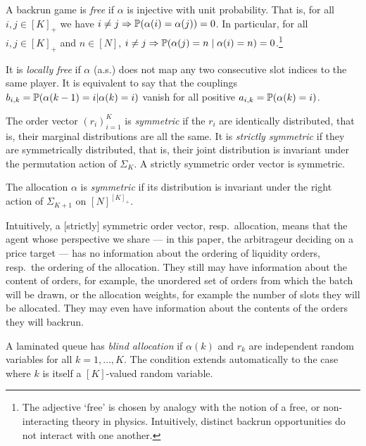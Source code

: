 \begin{definition}[Freeness] \label{locally-free} \label{free}

  A backrun game is \emph{free} if $\alpha$ is injective with unit probability.
  That is, for all $i,j\in [K]_+$ we have $i\neq j \Rightarrow \mathbb{P}(\alpha(i)=\alpha(j))=0$.
  In particular, for all $i,j\in [K]_+$ and $n\in[N]$, $i\neq j \Rightarrow \mathbb{P}(\alpha(j)=n\mid \alpha(i)=n)=0$.\footnote{The adjective `free' is chosen by analogy with the notion of a free, or non-interacting theory in physics. Intuitively, distinct backrun opportunities do not interact with one another.}
  
  It is \emph{locally free} if $\alpha$ (a.s.) does not map any two consecutive slot indices to the same player.
  It is equivalent to say that the couplings $b_{i,k}=\mathbb{P}(\alpha(k-1)=i|\alpha(k)=i)$ vanish for all positive $a_{i,k}=\mathbb{P}(\alpha(k)=i)$.

\end{definition}

\begin{definition}[Symmetry]

  The order vector \((r_i)_{i=1}^K\) is  \emph{symmetric} if the $r_i$ are identically distributed, that is, their marginal distributions are all the same. 
  It is \emph{strictly symmetric} if they are symmetrically distributed, that is, their joint distribution is invariant under the permutation action of $\Sigma_K$.
  A strictly symmetric order vector is symmetric.

  The allocation $\alpha$ is \emph{symmetric} if its distribution is invariant under the right action of $\Sigma_{K+1}$ on $[N]^{[K]_+}$.

\end{definition}

Intuitively, a [strictly] symmetric order vector, resp.~allocation, means that the agent whose perspective we share --- in this paper, the arbitrageur deciding on a price target --- has no information about the ordering of liquidity orders, resp.~the ordering of the allocation.
%
They still may have information about the content of orders, for example, the unordered set of orders from which the batch will be drawn, or the allocation weights, for example the number of slots they will be allocated.
%
They may even have information about the contents of the orders they will backrun.

\begin{definition} \label{blind}

  A laminated queue has \emph{blind allocation} if $\alpha(k)$ and $r_k$ are independent random variables for all $k=1,\ldots,K$.
  The condition extends automatically to the case where $k$ is itself a $[K]$-valued random variable.
\end{definition}

